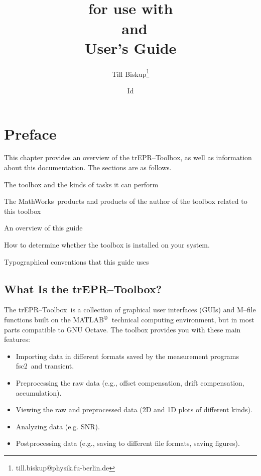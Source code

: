 \documentclass[a4paper]{refrep}
\title{\trEPRtb\\[1em] {\large for use with\\ \matlab\ and \octave}\\[1em] User's
Guide}
\author{Till Biskup\thanks{till.biskup@physik.fu-berlin.de}}
\date{$ $Id$ $}
\newcommand{\matlab}{\textsf{MATLAB$^{\mbox{\scriptsize\textregistered}}$}}
\newcommand{\mathworks}{\textsf{The MathWorks}}
\newcommand{\octave}{\textsf{GNU Octave}}
\newcommand{\trEPRtb}{\textsf{trEPR--Toolbox}}
\newcommand{\fsczwei}{\textsf{fsc2}}
\newcommand{\transient}{\textsf{transient}}
\begin{document}
\maketitle
\thispagestyle{empty}


\tableofcontents


\chapter{Preface}

This chapter provides an overview of the \trEPRtb, as well as information about
this documentation. The sections are as follows.

\vspace*{3\parsep}

\begin{description}\descriptioncolonfalse
  \item[What is the \trEPRtb?] The toolbox and the kinds of tasks it can perform
  \item[Related Products] \mathworks\ products and products of the author of the
  toolbox related to this toolbox
  \item[Using This Guide] An overview of this guide
  \item[Installation Information] How to determine whether the toolbox is
  installed on your system.
  \item[Typographical conventions] Typographical conventions that this guide uses
\end{description}

\clearpage


\section{What Is the \trEPRtb?}

The \trEPRtb\ is a collection of graphical user interfaces (GUIs) and M--file
functions built on the \matlab\ technical computing environment, but in most
parts compatible to \octave. The toolbox provides you with these main features:

\begin{itemize}
  \item Importing data in different formats saved by the measurement programs 
  \fsczwei\ and \transient.
  \item Preprocessing the raw data (e.g., offset compensation, drift 
  compensation, accumulation).
  \item Viewing the raw and preprocessed data (2D and 1D plots of different 
  kinds).
  \item Analyzing data (e.g. SNR).
  \item Postprocessing data (e.g., saving to different file formats, saving 
  figures).
\end{itemize}
\end{document}
